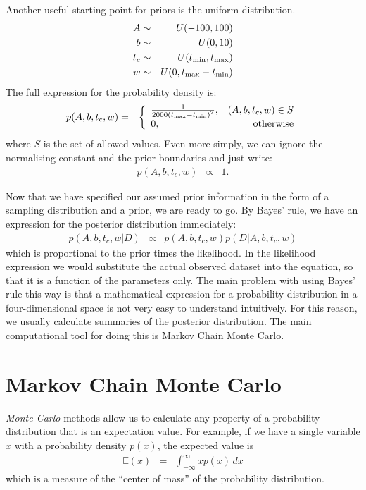 Another useful starting point for priors is the uniform distribution.
\begin{eqnarray}
A &\sim& U(-100, 100)\\
b &\sim& U(0, 10)\\
t_c &\sim& U(t_{\rm min}, t_{\rm max})\\
w &\sim& U(0, t_{\rm max} - t_{\rm min})
\end{eqnarray}
The full expression for the probability density is:
\begin{eqnarray}
p(A, b, t_c, w) &=&
\left\{
\begin{array}{lr}
\frac{1}{2000\left(t_{\rm max} - t_{\rm min}\right)^2}, & (A, b, t_c, w) \in S\\
0, & \textnormal{otherwise}
\end{array}
\right.
\end{eqnarray}
where $S$ is the set of allowed values. Even more simply, we can ignore the
normalising constant and the prior boundaries and just write:
\begin{eqnarray}
p(A, b, t_c, w) &\propto& 1.
\end{eqnarray}

Now that we have specified our assumed prior information in the form of a
sampling distribution and a prior, we are ready to go. By Bayes' rule, we
have an expression for the posterior distribution immediately:
\begin{eqnarray}
p(A, b, t_c, w | D) &\propto& p(A, b, t_c, w)p(D | A, b, t_c, w)
\end{eqnarray}
which is proportional to the prior times the likelihood. In the likelihood
expression we would substitute the actual observed dataset into the equation, so that it is
a function of the parameters only.
The main problem with using Bayes' rule this way is that a mathematical
expression for a probability distribution in a four-dimensional space is not
very easy to understand intuitively. For this reason, we usually calculate
summaries of the posterior distribution. The main computational tool for doing
this is Markov Chain Monte Carlo.

\section{Markov Chain Monte Carlo}
{\it Monte Carlo} methods allow us to calculate any property of a probability
distribution that is an expectation value. For example, if we have a
single variable
$x$ with a probability density $p(x)$, the expected value is
\begin{eqnarray}
\mathds{E}(x) &=& \int_{-\infty}^{\infty} x p(x) \, dx 
\end{eqnarray}
which is a measure of the ``center of mass'' of the probability distribution.

